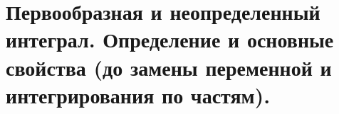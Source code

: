 \section{Первообразная и неопределенный интеграл. Определение и основные свойства (до замены переменной и интегрирования по частям).}